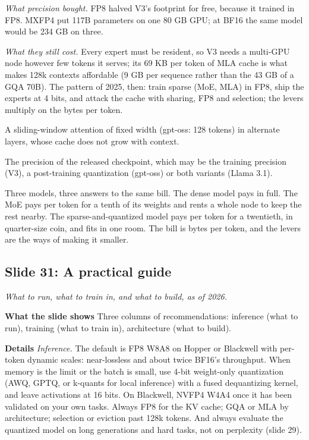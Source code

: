 \documentclass[11pt,letterpaper]{article}
\newcommand{\slide}[3]{%
  \subsection[Slide #1: #2]{Slide #1: #2}%
  {\color{muted}\itshape #3\par}\medskip}
\newcommand{\para}[1]{\medskip\noindent\textbf{#1}\quad}
\newenvironment{terms}{\begin{tcolorbox}[termsbox]\begin{description}[leftmargin=1.1em,itemsep=3pt,topsep=2pt,font=\normalfont]}{\end{description}\end{tcolorbox}}
\newcommand{\term}[2]{\item[\textbf{#1}]\index{#1} #2}
\newenvironment{intuition}{\begin{tcolorbox}[intuitionbox]}{\end{tcolorbox}}
\begin{document}
\emph{What precision bought.} FP8 halved V3's footprint for free, because it trained in FP8. MXFP4 put 117B parameters on one 80 GB GPU; at BF16 the same model would be 234 GB on three.

\emph{What they still cost.} Every expert must be resident, so V3 needs a multi-GPU node however few tokens it serves; its 69 KB per token of MLA cache is what makes 128k contexts affordable (9 GB per sequence rather than the 43 GB of a GQA 70B). The pattern of 2025, then: train sparse (MoE, MLA) in FP8, ship the experts at 4 bits, and attack the cache with sharing, FP8 and selection; the levers multiply on the bytes per token.

\begin{terms}
\term{banded attention}{A sliding-window attention of fixed width (gpt-oss: 128 tokens) in alternate layers, whose cache does not grow with context.}
\term{weights as shipped}{The precision of the released checkpoint, which may be the training precision (V3), a post-training quantization (gpt-oss) or both variants (Llama 3.1).}
\end{terms}

\begin{intuition}
Three models, three answers to the same bill. The dense model pays in full. The MoE pays per token for a tenth of its weights and rents a whole node to keep the rest nearby. The sparse-and-quantized model pays per token for a twentieth, in quarter-size coin, and fits in one room. The bill is bytes per token, and the levers are the ways of making it smaller.
\end{intuition}

\slide{31}{A practical guide}{What to run, what to train in, and what to build, as of 2026.}

\para{What the slide shows} Three columns of recommendations: inference (what to run), training (what to train in), architecture (what to build).

\para{Details} \emph{Inference.} The default is FP8 W8A8 on Hopper or Blackwell with per-token dynamic scales: near-lossless and about twice BF16's throughput. When memory is the limit or the batch is small, use 4-bit weight-only quantization (AWQ, GPTQ, or k-quants for local inference) with a fused dequantizing kernel, and leave activations at 16 bits. On Blackwell, NVFP4 W4A4 once it has been validated on your own tasks. Always FP8 for the KV cache; GQA or MLA by architecture; selection or eviction past 128k tokens. And always evaluate the quantized model on long generations and hard tasks, not on perplexity (slide 29).
\end{document}
